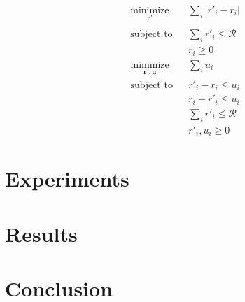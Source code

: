 \documentclass[12pt]{article}
\newcommand{\vect}[1]{\mathbf{#1}}  %
\begin{document}
    \begin{multicols}{2}
        \begin{equation} \label{eq:lp_math_constrain_rewards}
        \begin{aligned}
            & \underset{\vect{r'}}{\text{minimize}}
            & & \sum_{i}|r'_i - r_i|\\ \\
            & \text{subject to}
            & & \sum_{i}r'_i \leq \mathcal{R}\\
            &&& r_i \geq 0
        \end{aligned}
        \end{equation}\break
        \begin{equation} \label{eq:lp_code_constrain_rewards}
        \begin{aligned}
            & \underset{\vect{r'}, \vect{u}}{\text{minimize}}
            & & \sum_{i} u_i\\
            & \text{subject to}
            & & r'_i - r_i \leq u_i\\
            &&& r_i - r'_i \leq u_i\\
            &&& \sum_{i} r'_i \leq \mathcal{R}\\
            &&& r'_i, u_i \geq 0
        \end{aligned}
        \end{equation}
    \end{multicols}
    \section{Experiments}
    
    \section{Results}
    \section{Conclusion}
    
    \blindtext
    
    
\end{document}
